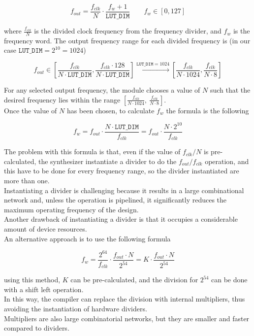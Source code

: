 \[
    f_{out} = \frac{f_{clk}}{N} \cdot \frac{f_w + 1}{\texttt{LUT\_DIM}}
    \qquad 
    f_w \in [0, 127]
\]

\noindent
where \(\frac{f_{clk}}{N}\) is the divided clock frequency from the frequency divider, and \(f_w\) is the frequency word.
The output frequency range for each divided frequency is (in our case \(\texttt{LUT\_DIM} = 2^{10} = 1024\))

\[
    f_{out} \in [ \frac{f_{clk}}{N \cdot \texttt{LUT\_DIM}}, \frac{f_{clk} \cdot 128}{N \cdot \texttt{LUT\_DIM}} ] \xrightarrow{\texttt{LUT\_DIM} = 1024}
    [ \frac{f_{clk}}{N \cdot 1024}, \frac{f_{clk}}{N \cdot 8} ]
\]

\noindent
For any selected output frequency, the module chooses a value of \(N\) such that the desired frequency lies within the range
\([ \frac{f_{clk}}{N \cdot 1024},\ \frac{f_{clk}}{N \cdot 8} ]\). \\
Once the value of \(N\) has been chosen, to calculate \(f_w\) the formula is the following

\[
    f_w = f_{out} \cdot \frac{N \cdot \texttt{LUT\_DIM}}{f_{clk}} = f_{out} \cdot \frac{N \cdot 2^{10}}{f_{clk}}
\]

\noindent
The problem with this formula is that, even if the value of \(f_{clk}/N\) is pre-calculated, the synthesizer instantiate a divider to do the \(f_{out} / f_{clk} \) operation, and this have to be done for every frequency range, so the divider instantiated are more than one. \\
Instantiating a divider is challenging because it results in a large combinational network and, unless the operation is pipelined, it significantly reduces the maximum operating frequency of the design. \\
Another drawback of instantiating a divider is that it occupies a considerable amount of device resources. \\
An alternative approach is to use the following formula

\[
    f_w = \frac{2^{64}}{f_{clk}} \cdot \frac{f_{out} \cdot N}{2^{54}} = K \cdot \frac{f_{out} \cdot N}{2^{54}}
\]

\noindent
using this method, \(K\) can be pre-calculated, and the division for \(2^{54}\) can be done with a shift left operation. \\
In this way, the compiler can replace the division with internal multipliers, thus avoiding the instantiation of hardware dividers. \\
Multipliers are also large combinatorial networks, but they are smaller and faster compared to dividers.

